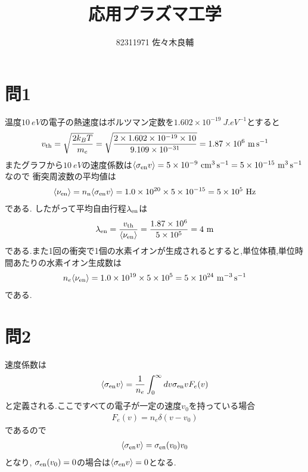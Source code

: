 \documentclass[uplatex,a4j,11pt,dvipdfmx]{jsarticle}
\begin{document}
\title{応用プラズマ工学}
\author{82311971 佐々木良輔}
\date{}
\maketitle
\section*{問1}
温度$10\ \si{eV}$の電子の熱速度はボルツマン定数を$1.602\times10^{-19}\ \si{J.eV^{-1}}$とすると
\begin{align}
  v_{\rm th}=\sqrt{\frac{2k_BT}{m_e}}=\sqrt{\frac{2\times1.602\times10^{-19}\times10}{9.109\times10^{-31}}}=1.87\times10^6\ \si{m.s^{-1}}
\end{align}
またグラフから$10\ \si{eV}$の速度係数は$\langle\sigma_{\rm en}v\rangle=5\times10^{-9}\ \si{cm^3.s^{-1}}=5\times10^{-15}\ \si{m^3.s^{-1}}$なので
衝突周波数の平均値は
\begin{align}
  \langle\nu_{\rm en}\rangle=n_{\rm n}\langle\sigma_{\rm en}v\rangle=1.0\times10^{20}\times5\times10^{-15}=5\times10^5\ \si{Hz}
\end{align}
である.
したがって平均自由行程$\lambda_{\rm en}$は
\begin{align}
  \lambda_{\rm en}=\frac{v_{\rm th}}{\langle\nu_{\rm en}\rangle}=\frac{1.87\times10^6}{5\times10^5}=4\ \si{m}
\end{align}
である.また1回の衝突で1個の水素イオンが生成されるとすると,単位体積,単位時間あたりの水素イオン生成数は
\begin{align}
  n_e\langle\nu_{\rm en}\rangle=1.0\times10^{19}\times5\times10^5=5\times10^{24}\ \si{m^{-3}.s^{-1}}
\end{align}
である.
\section*{問2}
速度係数は
\begin{align}
  \langle\sigma_{\rm en}v\rangle=\frac{1}{n_e}\int_0^\infty dv\sigma_{\rm en}vF_e(v)
\end{align}
と定義される.ここですべての電子が一定の速度$v_0$を持っている場合
\begin{align}
  F_e(v)=n_e\delta(v-v_0)
\end{align}
であるので
\begin{align}
  \langle\sigma_{\rm en}v\rangle=\sigma_{\rm en}(v_0)v_0
\end{align}
となり, $\sigma_{\rm en}(v_0)=0$の場合は$\langle\sigma_{\rm en}v\rangle=0$となる.
\end{document}
